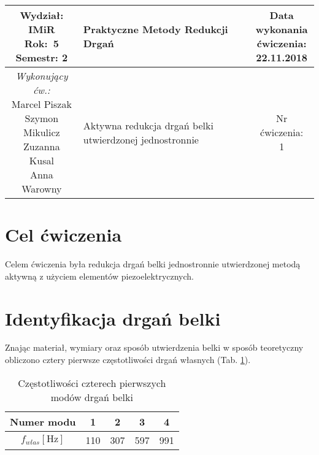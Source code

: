 \documentclass[polish,a4paper,11pt]{mwart}
\let\Oldsection\section
\renewcommand{\section}{\FloatBarrier\Oldsection}
\begin{document}
	\begin{table}[h] %
	\centering
		\begin{tabular}{ | c |  >{\centering\arraybackslash}m{5.5cm} | c | }
			\hline
			\makecell{ \textbf{Wydział:} \\ IMiR \\ \textbf{Rok:}~5 \\ Semestr: 2 } &
			\textbf{\large{Praktyczne Metody Redukcji Drgań}} &
			\makecell{Data \\ wykonania \\ ćwiczenia: \\ 22.11.2018} \\ \hline
      \makecell{\emph{Wykonujący ćw.:} \\ Marcel Piszak \\ Szymon Mikulicz \\ Zuzanna Kusal \\ Anna Warowny} &
			\large{Aktywna redukcja drgań belki utwierdzonej jednostronnie} &
			\makecell{Nr ćwiczenia: \\ 1} \\ \hline
		\end{tabular}
	\end{table}

  \section{Cel ćwiczenia}

  Celem ćwiczenia była redukcja drgań belki jednostronnie utwierdzonej metodą
  aktywną z użyciem elementów piezoelektrycznych.

  \section{Identyfikacja drgań belki}

  Znając materiał, wymiary oraz sposób utwierdzenia belki w sposób teoretyczny obliczono
  cztery pierwsze częstotliwości drgań własnych (Tab. \ref{tab:fwlas}).

  \begin{table}[!tbh]
    \centering
    \caption{Częstotliwości czterech pierwszych modów drgań belki}
    \begin{tabular}{|c|c|c|c|c|}
      \hline
      Numer modu & 1 & 2 & 3 & 4 \\
      \hline
      $f_{wlas} [\si{\hertz}]$ & 110 & 307 & 597 & 991 \\
      \hline
    \end{tabular}
    \label{tab:fwlas}
  \end{table}
\end{document}
